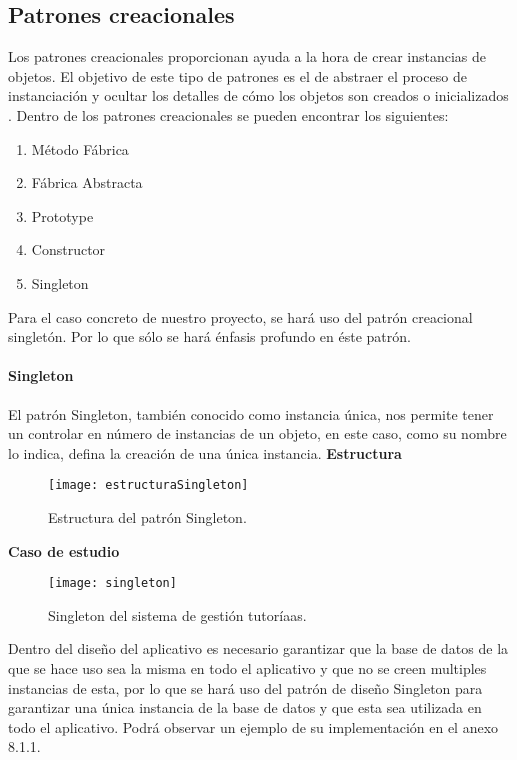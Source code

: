 \subsection{Patrones creacionales}
Los patrones creacionales proporcionan ayuda a la hora de crear instancias de objetos. El objetivo
de este tipo de patrones es el de abstraer el proceso de instanciación y ocultar los detalles de cómo los objetos
son creados o inicializados \cite{Bol_2014}.
Dentro de los patrones creacionales se pueden encontrar los siguientes:
\begin{enumerate}
\item Método Fábrica
\item Fábrica Abstracta
\item Prototype
\item Constructor
\item Singleton
\end{enumerate}

Para el caso concreto de nuestro proyecto, se hará uso del patrón creacional singletón. Por lo que sólo se hará énfasis profundo en éste patrón.
\newpage
\paragraph{Singleton}
El patrón Singleton, también conocido como instancia única, nos permite tener un controlar en número de instancias de un objeto, en este caso, como su nombre lo indica, defina la creación de una única instancia.
\newline
\indent\textbf{Estructura}
\newline
\begin{figure}[H]
	\centering
	\texttt{[image: estructuraSingleton]}
    \centering
    \caption{Estructura del patrón Singleton.}
	\label{fig:eSingleton}
\end{figure}
\indent\textbf{Caso de estudio}
\newline
\begin{figure}[H]
	\centering
	\texttt{[image: singleton]}
    \centering
    \caption{Singleton del sistema de gestión tutoríaas.}
	\label{fig:singleton}
\end{figure}

\indent Dentro del diseño del aplicativo es necesario garantizar que la base de datos de la que se hace uso sea la misma en todo el aplicativo y que no se creen multiples instancias de esta, por lo que se hará uso del patrón de diseño Singleton para garantizar una única instancia de la base de datos y que esta sea utilizada en todo el aplicativo. Podrá observar un ejemplo de su implementación en el anexo 8.1.1.
\newpage
